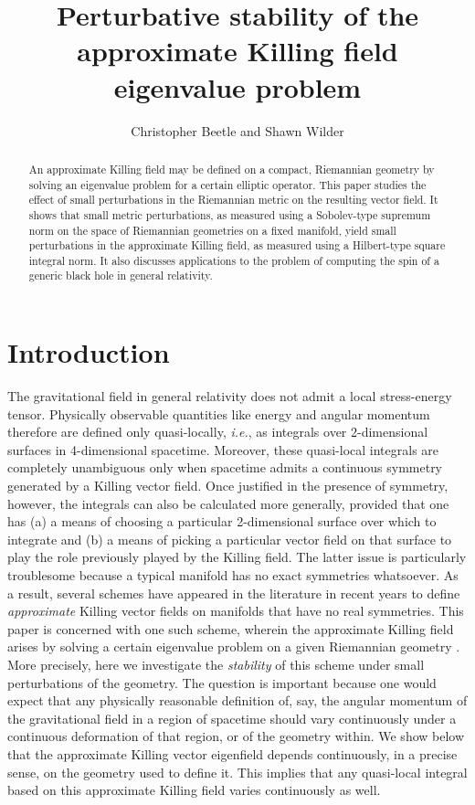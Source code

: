 \documentclass[12pt,letterpaper]{iopart}
\begin{document}
\title{Perturbative stability of the approximate Killing field eigenvalue problem}
\author{Christopher Beetle and Shawn Wilder}
\address{Department of Physics, Florida Atlantic University, 777 Glades Road, Boca Raton, Florida 33431}


\begin{abstract}
An approximate Killing field may be defined on a compact, Riemannian geometry by solving an eigenvalue problem for a certain elliptic operator.  This paper studies the effect of small perturbations in the Riemannian metric on the resulting vector field.  It shows that small metric perturbations, as measured using a Sobolev-type supremum norm on the space of Riemannian geometries on a fixed manifold, yield small perturbations in the approximate Killing field, as measured using a Hilbert-type square integral norm.  It also discusses applications to the problem of computing the spin of a generic black hole in general relativity.
\end{abstract}



\section{Introduction}

The gravitational field in general relativity does not admit a local stress-energy tensor.  Physically observable quantities like energy and angular momentum therefore are defined only quasi-locally, \textit{i.e.}, as integrals over 2-dimensional surfaces in 4-dimensional spacetime.  Moreover, these quasi-local integrals are completely unambiguous only when spacetime admits a continuous symmetry generated by a Killing vector field.  Once justified in the presence of symmetry, however, the integrals can also be calculated more generally, provided that one has (a) a means of choosing a particular 2-dimensional surface over which to integrate and (b) a means of picking a particular vector field on that surface to play the role previously played by the Killing field.  The latter issue is particularly troublesome because a typical manifold has no exact symmetries whatsoever.  As a result, several schemes \cite{Dreyer, Harte, CookWhiting, Lovelace, Beetle} have appeared in the literature in recent years to define \textit{approximate} Killing vector fields on manifolds that have no real symmetries.  This paper is concerned with one such scheme, wherein the approximate Killing field arises by solving a certain eigenvalue problem on a given Riemannian geometry \cite{Matzner, Lovelace, Beetle}.  More precisely, here we investigate the \textit{stability} of this scheme under small perturbations of the geometry.  The question is important because one would expect that any physically reasonable definition of, say, the angular momentum of the gravitational field in a region of spacetime should vary continuously under a continuous deformation of that region, or of the geometry within.  We show below that the approximate Killing vector eigenfield depends continuously, in a precise sense, on the geometry used to define it.  This implies that any quasi-local integral based on this approximate Killing field varies continuously as well.
\end{document}
